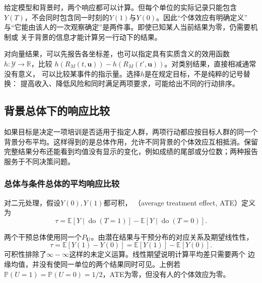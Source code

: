 给定模型和背景时，两个响应都可以计算。但每个单位的实际记录只能包含
\(Y(T)\)，不会同时包含同一时刻的\(Y(1)\)与\(Y(0)\)。因此“个体效应有明确定义”
与“它能由该人的一次观察确定”是两件事。即使已知某人当前结果为零，仍需要机制或
关于背景的信息才能计算另一行动下的结果。

对向量结果，可以先报告各坐标差，也可以指定具有实质含义的效用函数
\(h:\mathcal Y\to\mathbb R\)，比较
\(h(R_M(t,\bm u))-h(R_M(t',\bm u))\)。对类别结果，直接相减通常没有意义，
可以比较某事件的指示量。选择\(h\)是在规定目标，不是纯粹的记号替换：
提高收入、降低风险和同时满足两项要求，可能给出不同的行动排序。

\subsection{背景总体下的响应比较}
\label{sec:causal-population-response}

如果目标是决定一项培训是否适用于指定人群，两项行动都应按目标人群的同一个背景分布平均。这样得到的是总体作用，允许不同背景的个体效应互相抵消。保留完整结果分布还能看到均值没有显示的变化，例如成绩的尾部或分位数；两种报告服务于不同决策问题。

\subsubsection{总体与条件总体的平均响应比较}
\label{sec:causal-average-response}

\begin{definition}[平均处理效应]
  \label{def:causal-average-treatment-effect}
  对二元处理，假设\(Y(0),Y(1)\)都可积，
  （average treatment effect, ATE）定义为
  \begin{equation}
    \tau
    =
    \mathbb E[Y\mid\operatorname{do}(T=1)]
    -
    \mathbb E[Y\mid\operatorname{do}(T=0)].
    \label{eq:causal-ate-interventional}
  \end{equation}
\end{definition}

两个干预总体使用同一个\(P_{\bm U}\)。由潜在结果与干预分布的对应关系及期望线性性，
\begin{equation}
  \tau
  =\mathbb E[Y(1)-Y(0)]
  =\mathbb E[Y(1)]-\mathbb E[Y(0)].
  \label{eq:causal-ate-potential-outcomes}
\end{equation}
可积性排除了\(\infty-\infty\)这样的未定义运算。线性期望说明计算平均差只需要两个
边缘均值，并没有使同一单位的两个结果同时可见。上例若
\(\mathbb P(U=1)=\mathbb P(U=0)=1/2\)，ATE为零，但没有人的个体效应为零。

